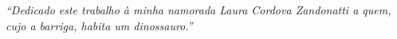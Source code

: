 \null
\vfill

\hfill \parbox{10.0cm} {\noindent \textit{``Dedicado este trabalho à minha namorada Laura Cordova Zandonatti a quem, cujo a barriga, habita um dinossauro.''}}

